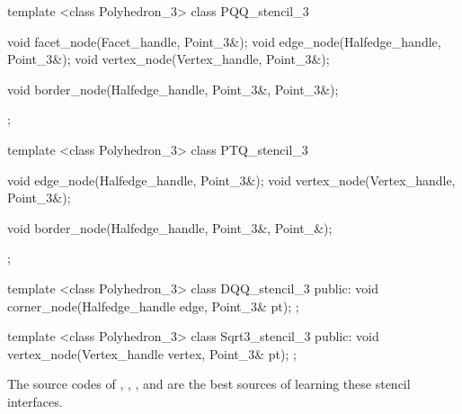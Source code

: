 

\begin{ccExampleCode}
template <class Polyhedron_3>
class PQQ_stencil_3 {
  void facet_node(Facet_handle, Point_3&);
  void edge_node(Halfedge_handle, Point_3&);
  void vertex_node(Vertex_handle, Point_3&);

  void border_node(Halfedge_handle, Point_3&, Point_3&);
};

template <class Polyhedron_3>
class PTQ_stencil_3 {
  void edge_node(Halfedge_handle, Point_3&);
  void vertex_node(Vertex_handle, Point_3&);

  void border_node(Halfedge_handle, Point_3&, Point_&);
};

template <class Polyhedron_3>
class DQQ_stencil_3 {
public:
  void corner_node(Halfedge_handle edge, Point_3& pt);
};

template <class Polyhedron_3>
class Sqrt3_stencil_3 {
public:
  void vertex_node(Vertex_handle vertex, Point_3& pt);
};
\end{ccExampleCode}

The source codes of , ,
, and  are
the best sources of learning these stencil interfaces. 





